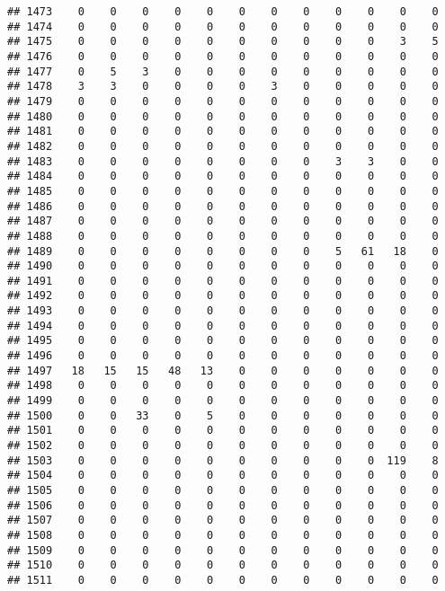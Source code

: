 \documentclass[]{article}
\begin{document}
\begin{verbatim}
## 1473    0    0    0    0    0    0    0    0    0    0    0    0
## 1474    0    0    0    0    0    0    0    0    0    0    0    0
## 1475    0    0    0    0    0    0    0    0    0    0    3    5
## 1476    0    0    0    0    0    0    0    0    0    0    0    0
## 1477    0    5    3    0    0    0    0    0    0    0    0    0
## 1478    3    3    0    0    0    0    3    0    0    0    0    0
## 1479    0    0    0    0    0    0    0    0    0    0    0    0
## 1480    0    0    0    0    0    0    0    0    0    0    0    0
## 1481    0    0    0    0    0    0    0    0    0    0    0    0
## 1482    0    0    0    0    0    0    0    0    0    0    0    0
## 1483    0    0    0    0    0    0    0    0    3    3    0    0
## 1484    0    0    0    0    0    0    0    0    0    0    0    0
## 1485    0    0    0    0    0    0    0    0    0    0    0    0
## 1486    0    0    0    0    0    0    0    0    0    0    0    0
## 1487    0    0    0    0    0    0    0    0    0    0    0    0
## 1488    0    0    0    0    0    0    0    0    0    0    0    0
## 1489    0    0    0    0    0    0    0    0    5   61   18    0
## 1490    0    0    0    0    0    0    0    0    0    0    0    0
## 1491    0    0    0    0    0    0    0    0    0    0    0    0
## 1492    0    0    0    0    0    0    0    0    0    0    0    0
## 1493    0    0    0    0    0    0    0    0    0    0    0    0
## 1494    0    0    0    0    0    0    0    0    0    0    0    0
## 1495    0    0    0    0    0    0    0    0    0    0    0    0
## 1496    0    0    0    0    0    0    0    0    0    0    0    0
## 1497   18   15   15   48   13    0    0    0    0    0    0    0
## 1498    0    0    0    0    0    0    0    0    0    0    0    0
## 1499    0    0    0    0    0    0    0    0    0    0    0    0
## 1500    0    0   33    0    5    0    0    0    0    0    0    0
## 1501    0    0    0    0    0    0    0    0    0    0    0    0
## 1502    0    0    0    0    0    0    0    0    0    0    0    0
## 1503    0    0    0    0    0    0    0    0    0    0  119    8
## 1504    0    0    0    0    0    0    0    0    0    0    0    0
## 1505    0    0    0    0    0    0    0    0    0    0    0    0
## 1506    0    0    0    0    0    0    0    0    0    0    0    0
## 1507    0    0    0    0    0    0    0    0    0    0    0    0
## 1508    0    0    0    0    0    0    0    0    0    0    0    0
## 1509    0    0    0    0    0    0    0    0    0    0    0    0
## 1510    0    0    0    0    0    0    0    0    0    0    0    0
## 1511    0    0    0    0    0    0    0    0    0    0    0    0

\end{verbatim}
\end{document}
